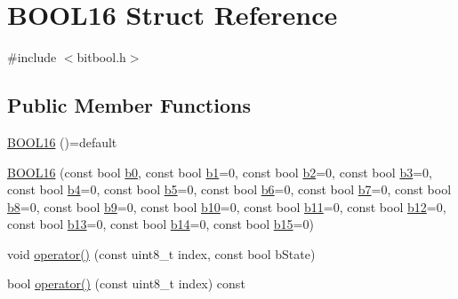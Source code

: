 \hypertarget{struct_b_o_o_l16}{}\section{B\+O\+O\+L16 Struct Reference}
\label{struct_b_o_o_l16}


{\ttfamily \#include $<$bitbool.\+h$>$}

\subsection*{Public Member Functions}
\begin{DoxyCompactItemize}
\item 
\hyperlink{struct_b_o_o_l16_aa6177ab6503ebcdd2d2a7899feeef548}{B\+O\+O\+L16} ()=default
\item 
\hyperlink{struct_b_o_o_l16_a5c8f7ace1d8574f7ffbfbf6fcb7463ea}{B\+O\+O\+L16} (const bool \hyperlink{struct_b_o_o_l16_a1c75989c92ef896a7056bf995446e8ed}{b0}, const bool \hyperlink{struct_b_o_o_l16_a630e67515ea8cf94ccae883690e7a47e}{b1}=0, const bool \hyperlink{struct_b_o_o_l16_a1661ed9958a65512917fdf3199cfe726}{b2}=0, const bool \hyperlink{struct_b_o_o_l16_ad95cffa7a6663cbb83fad76454cdf7d6}{b3}=0, const bool \hyperlink{struct_b_o_o_l16_a1ea7bc124927af4c5547ddfc1d5d0423}{b4}=0, const bool \hyperlink{struct_b_o_o_l16_a27d547eece22106f5580843a67075d15}{b5}=0, const bool \hyperlink{struct_b_o_o_l16_a6534f474b6a98663db15acb06cc44bce}{b6}=0, const bool \hyperlink{struct_b_o_o_l16_a3f8d4ed2cf7b3a1e13655e2037d2caa1}{b7}=0, const bool \hyperlink{struct_b_o_o_l16_a9dde596bdadf85a589643c7da9c7f6ee}{b8}=0, const bool \hyperlink{struct_b_o_o_l16_ae8e1fcafd82cc0d4490a39185af124c1}{b9}=0, const bool \hyperlink{struct_b_o_o_l16_ac44f4602dac15b4761e88c72c70e9269}{b10}=0, const bool \hyperlink{struct_b_o_o_l16_adb855b1e1ff298e3134feb8cbbe4c02e}{b11}=0, const bool \hyperlink{struct_b_o_o_l16_a190bf16641136969b802fbf3416e2d04}{b12}=0, const bool \hyperlink{struct_b_o_o_l16_a36c98eeed6f52983fe6fca57718aeb08}{b13}=0, const bool \hyperlink{struct_b_o_o_l16_ab8070096133feade0861e2de2cd45179}{b14}=0, const bool \hyperlink{struct_b_o_o_l16_a66518572002310954105e32a965ea9f9}{b15}=0)
\item 
void \hyperlink{struct_b_o_o_l16_a572432f46b8e2e877b80ab5a16f5f160}{operator()} (const uint8\+\_\+t index, const bool b\+State)
\item 
bool \hyperlink{struct_b_o_o_l16_a4a65f5b5680eab5e72f503e40eb26f3c}{operator()} (const uint8\+\_\+t index) const
\item 

\end{DoxyCompactItemize}
